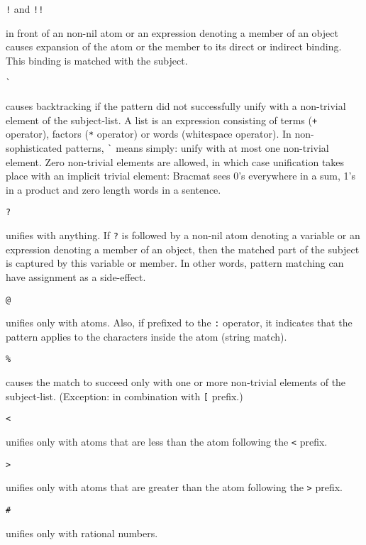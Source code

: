 \documentclass[12pt]{article}
\begin{document}
\begin{description}
\item \verb|!| and \verb|!!|\par
  in front of an non-nil atom or an expression denoting a member of an
  object causes expansion of the atom or the member to its direct or
  indirect binding. This binding is matched with the subject.

\item \verb|`|\par
  causes backtracking if the pattern did not successfully unify with a
  non-trivial element of the subject-list. A list is an expression
  consisting of terms (\verb|+| operator), factors (\verb|*| operator)
  or words (whitespace operator). In non-sophisticated patterns,
  \verb|`| means simply: unify with at most one non-trivial
  element. Zero non-trivial elements are allowed, in which case
  unification takes place with an implicit trivial element: Bracmat
  sees 0's everywhere in a sum, 1's in a product and zero length words
  in a sentence.

\item \verb|?|\par
  unifies with anything. If \verb|?| is followed by a non-nil atom
  denoting a variable or an expression denoting a member of an object,
  then the matched part of the subject is captured by this variable or
  member. In other words, pattern matching can have assignment as a
  side-effect.

\item \verb|@|\par
  unifies only with atoms. Also, if prefixed to the \verb|:| operator,
  it indicates that the pattern applies to the characters inside the
  atom (string match).

\item \verb|%|\par
  causes the match to succeed only with one or more non-trivial
  elements of the subject-list. (Exception: in combination with
  \verb|[| prefix.)

\item \verb|<|\par
  unifies only with atoms that are less than the atom following the
  \verb|<| prefix.

\item \verb|>|\par
  unifies only with atoms that are greater than the atom following the
  \verb|>| prefix.

\item \verb|#|\par
  unifies only with rational numbers.


\end{description}
\end{document}
